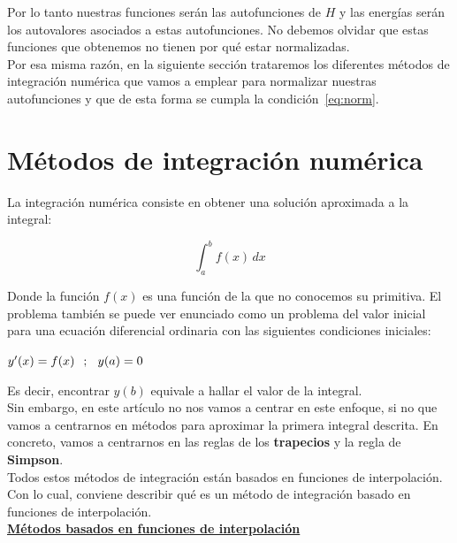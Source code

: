 \documentclass[12pt]{article}
\begin{document}
Por lo tanto nuestras funciones serán las autofunciones de $H$ y las energías serán los autovalores asociados a estas autofunciones. No debemos olvidar que estas funciones que obtenemos no tienen por qué estar normalizadas.\\

Por esa misma razón, en la siguiente sección trataremos los diferentes métodos de integración numérica que vamos a emplear para normalizar nuestras autofunciones y que de esta forma se cumpla la condición~\eqref{eq:norm}.

\newpage
\section{Métodos de integración numérica}

La integración numérica consiste en obtener una solución aproximada a la integral:

\begin{equation*}
\int_{a}^{b} f(x) \,dx 
\end{equation*}

Donde la función $f(x)$ es una función de la que no conocemos su primitiva. El problema también se puede ver enunciado como un problema del valor inicial para una ecuación diferencial ordinaria con las siguientes condiciones iniciales:

\begin{center}
$y'(x)=f(x) \hspace{2.5mm} ; \hspace{2.5mm} y(a)=0$\\
\end{center}

Es decir, encontrar $y(b)$ equivale a hallar el valor de la integral. \\

Sin embargo, en este artículo no nos vamos a centrar en este enfoque, si no que vamos a centrarnos en métodos para aproximar la primera integral descrita.
En concreto, vamos a centrarnos en las reglas de los \textbf{trapecios} y la regla de \textbf{Simpson}. \\

Todos estos métodos de integración están basados en funciones de interpolación. Con lo cual, conviene describir qué es un método de integración basado en funciones de interpolación.\\

\underline{\textbf{Métodos basados en funciones de interpolación}} \\
\end{document}
